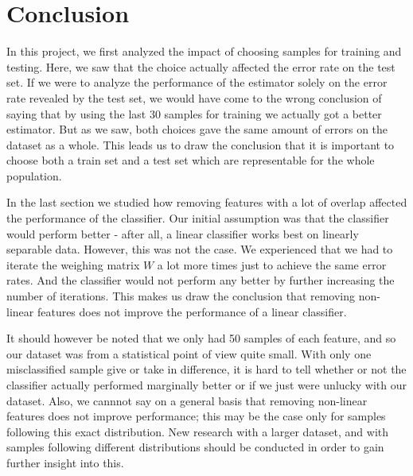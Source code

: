 \documentclass{article}
\begin{document}
\section{Conclusion}

In this project, we first analyzed the impact of choosing samples for training and testing.
Here, we saw that the choice actually affected the error rate on the test set. If we were to
analyze the performance of the estimator solely on the error rate revealed by the test set, we
would have come to the wrong conclusion of saying that by using the last 30 samples for training
we actually got a  better estimator. But as we saw, both choices gave the same amount of errors
on the dataset as a whole. This leads us to draw the conclusion that it is important to choose
both a train set and a test set which are  representable for the whole population.

In the last section we studied how removing features with a lot of overlap affected the performance
of the classifier. Our initial assumption was that the classifier would perform better - after all,
a linear classifier works best on linearly separable data. However, this was not the case. We experienced
that we had to iterate the weighing matrix $W$ a lot more times just to achieve the same error rates. And
the classifier would not perform any better by further increasing the number of iterations. This makes us
draw the conclusion that removing non-linear features does not improve the performance of a linear classifier.

It should however be noted that we only had 50 samples of each feature, and so our dataset was from a
statistical point of view quite small. With only one misclassified sample give or take in difference,
it is hard to tell whether or not the classifier actually performed marginally better or if we just were
unlucky with our dataset. Also, we cannnot say on a general basis that removing non-linear features does
not improve performance; this may be the case only for samples following this exact distribution. New
research with a larger dataset, and with samples following different distributions should be conducted
in order to gain further insight into this.

\printbibliography
\end{document}
